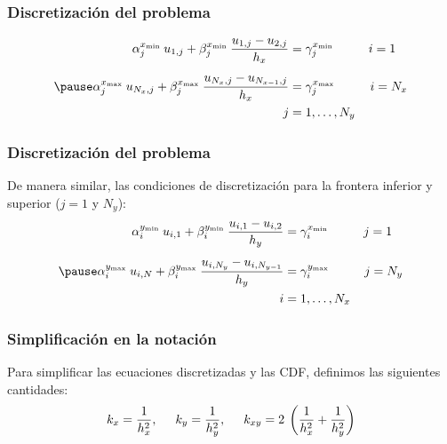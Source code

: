 \documentclass[12pt]{beamer}
\begin{document}
\begin{frame}
\frametitle{Discretización del problema}
\begin{eqnarray*}
\begin{aligned}
\alpha_{j}^{x_{\text{\tiny{min}}}} \: u_{1, j} + \beta_{j}^{x_{\text{\tiny{min}}}} \: \dfrac{u_{1, j} - u_{2, j}}{h_{x}} &= \gamma_{j}^{x_{\text{\tiny{min}}}} \hspace{1cm} i = 1 \\[0.5em] \pause
\alpha_{j}^{x_{\mbox{\tiny{max}}}} \: u_{N_{x}, j} + \beta_{j}^{x_{\text{\tiny{max}}}} \: \dfrac{u_{N_{x}, j} - u_{N_{x-1}, j}}{h_{x}} &= \gamma_{j}^{x_{\text{\tiny{max}}}} \hspace{1cm} i = N_{x} \\
j &= 1, \ldots, N_{y}
\end{aligned}
\end{eqnarray*}
\end{frame}
\begin{frame}
\frametitle{Discretización del problema}
De manera similar, las condiciones de discretización para la frontera inferior y superior ($j = 1$ y $N_{y}$):
\pause
\begin{eqnarray*}
\begin{aligned}
\alpha_{i}^{y_{\text{\tiny{min}}}} \: u_{i, 1} + \beta_{i}^{y_{\text{\tiny{min}}}} \: \dfrac{u_{i, 1} - u_{i, 2}}{h_{y}} &= \gamma_{i}^{x_{\text{\tiny{min}}}} \hspace{1cm} j = 1 \\[0.5em] \pause
\alpha_{i}^{y_{\text{\tiny{max}}}} \: u_{i, N} + \beta_{i}^{y_{\text{\tiny{max}}}} \: \dfrac{u_{i, N_{y}} - u_{i, N_{y-1}}}{h_{y}} &= \gamma_{i}^{y_{\text{\tiny{max}}}} \hspace{1cm} j = N_{y} \\
i &= 1, \ldots, N_{x}
\end{aligned}
\end{eqnarray*}
\end{frame}
\begin{frame}
\frametitle{Simplificación en la notación}
Para simplificar las ecuaciones discretizadas y las CDF, definimos las siguientes cantidades:
\pause
\begin{align}
k_{x} = \dfrac{1}{h_{x}^{2}}, \hspace{0.5cm} k_{y} = \dfrac{1}{h_{y}^{2}}, \hspace{0.5cm} k_{xy} = 2 \: \left( \dfrac{1}{h_{x}^{2}} + \dfrac{1}{h_{y}^{2}} \right)
\label{eq:ecuacion_13_07}
\end{align}
\end{frame}
\end{document}
